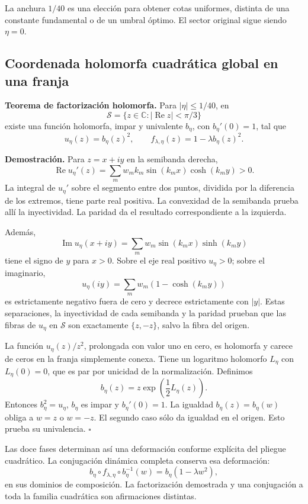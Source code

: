 La anchura \(1/40\) es una elección para obtener cotas uniformes, distinta de una constante fundamental o de un umbral óptimo. El sector original sigue siendo \(\eta=0\).


\subsection{Coordenada holomorfa cuadrática global en una franja}
\label{hmtfg:desarrollo:4}

\textbf{Teorema de factorización holomorfa.} Para \(|\eta|\le1/40\), en
\[
\mathcal S=\{z\in\mathbb C:|\operatorname{Re}z|<\pi/3\}
\]
existe una función holomorfa, impar y univalente \(b_\eta\), con \(b_\eta'(0)=1\), tal que
\[
\boxed{u_\eta(z)=b_\eta(z)^2,\qquad
f_{\lambda,\eta}(z)=1-\lambda b_\eta(z)^2.}
\]

\textbf{Demostración.} Para \(z=x+iy\) en la semibanda derecha,
\[
\operatorname{Re}u_\eta'(z)
=\sum_mw_mk_m\sin(k_mx)\cosh(k_my)>0.
\]
La integral de \(u_\eta'\) sobre el segmento entre dos puntos, dividida por la diferencia de los extremos, tiene parte real positiva. La convexidad de la semibanda prueba allí la inyectividad. La paridad da el resultado correspondiente a la izquierda.

Además,
\[
\operatorname{Im}u_\eta(x+iy)
=\sum_mw_m\sin(k_mx)\sinh(k_my)
\]
tiene el signo de \(y\) para \(x>0\). Sobre el eje real positivo \(u_\eta>0\); sobre el imaginario,
\[
u_\eta(iy)=\sum_mw_m(1-\cosh(k_my))
\]
es estrictamente negativo fuera de cero y decrece estrictamente con \(|y|\). Estas separaciones, la inyectividad de cada semibanda y la paridad prueban que las fibras de \(u_\eta\) en \(\mathcal S\) son exactamente \(\{z,-z\}\), salvo la fibra del origen.

La función \(u_\eta(z)/z^2\), prolongada con valor uno en cero, es holomorfa y carece de ceros en la franja simplemente conexa. Tiene un logaritmo holomorfo \(L_\eta\) con \(L_\eta(0)=0\), que es par por unicidad de la normalización. Definimos
\[
b_\eta(z)=z\exp\!\left(\frac12L_\eta(z)\right).
\]
Entonces \(b_\eta^2=u_\eta\), \(b_\eta\) es impar y \(b_\eta'(0)=1\). La igualdad \(b_\eta(z)=b_\eta(w)\) obliga a \(w=z\) o \(w=-z\). El segundo caso sólo da igualdad en el origen. Esto prueba su univalencia. \(\square\)

Las doce fases determinan así una deformación conforme explícita del pliegue cuadrático. La conjugación dinámica completa conserva esa deformación:
\[
b_\eta\circ f_{\lambda,\eta}\circ b_\eta^{-1}(w)
=b_\eta(1-\lambda w^2),
\]
en sus dominios de composición. La factorización demostrada y una conjugación a toda la familia cuadrática son afirmaciones distintas.



